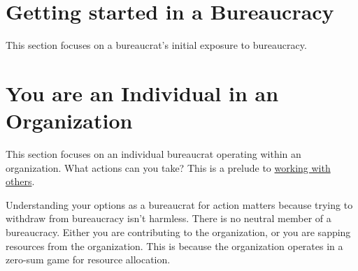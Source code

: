 \documentclass{book}
\begin{document}
  \chapter{Getting started in a Bureaucracy\label{sec:getting-started}}
  \minitoc
    This section focuses on a bureaucrat's initial exposure to bureaucracy. 
  
     \clearpage
     \clearpage
     \clearpage
     \clearpage
     \clearpage
     \clearpage
     \clearpage
     \clearpage
     \clearpage
  \clearpage
  \chapter{You are an Individual in an Organization\label{sec:individual-in-org}}
  \minitoc
    This section focuses on an individual bureaucrat operating within an organization. What actions can you take?  This is a prelude to 
    \hyperref[sec:working-with-other-bureaucrats]{working with others}.
    
    Understanding your options as a bureaucrat for action matters because trying to withdraw from bureaucracy isn't harmless. There is no neutral member of a bureaucracy. Either you are contributing to the organization, or you are sapping resources from the organization. This is because the organization operates in a zero-sum game for resource allocation.
     \clearpage
     \clearpage
     \clearpage
     \clearpage

     \clearpage
     \clearpage
     \clearpage
     \clearpage
     \clearpage
     \clearpage
     \clearpage
     \clearpage
     \clearpage

     \clearpage %
     \clearpage %
     \clearpage %
     \clearpage %
     \clearpage %
     \clearpage %
     \clearpage 
     \clearpage %
\end{document}
